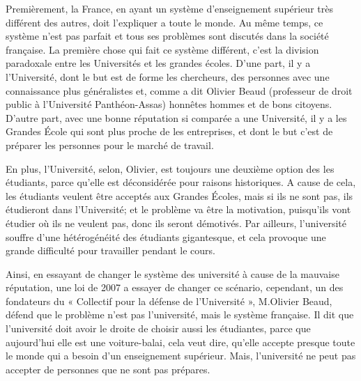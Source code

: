 \documentclass[a4paper,11pt]{article}
\begin{document}
\titleTMB 
\newpage


%




%



Premièrement, la France, en ayant un système d'enseignement supérieur très différent des autres, doit l'expliquer a toute le monde. Au même temps, ce système n'est pas parfait et tous ses problèmes sont discutés dans la société française.
La première chose qui fait ce système différent, c'est la division paradoxale entre les Universités et les grandes écoles.
D'une part, il y a l'Université, dont le but est de forme les chercheurs, des personnes avec une connaissance plus généralistes et, comme a dit Olivier Beaud (professeur de droit public à l’Université Panthéon-Assas)  honnêtes hommes et de bons citoyens.
D'autre part, avec une bonne réputation si comparée a une Université, il y a les
Grandes École qui sont  plus proche de les entreprises, et dont  le but c'est de
préparer les personnes pour le marché de travail.

En plus, l'Université, selon, Olivier, est toujours une deuxième option des les étudiants, parce qu'elle est déconsidérée pour raisons historiques. A cause de cela,  les étudiants veulent être acceptés aux Grandes Écoles, mais si ils ne sont  pas, ils étudieront dans l'Université; et le problème va être la motivation, puisqu'ils vont étudier où ils ne veulent pas, donc ils seront démotivés.
Par   ailleurs,   l'université  souffre   d'une   hétérogénéité  des   étudiants
gigantesque, et cela  provoque une grande difficulté pour  travailler pendant le
cours.

Ainsi, en essayant de changer le système des université à cause de la mauvaise réputation, une loi de 2007 a essayer de changer ce scénario, cependant, un des fondateurs du « Collectif pour la défense de l’Université », M.Olivier Beaud, défend que le problème n'est pas l'université, mais le système française. Il dit que l’université doit avoir le droite de choisir aussi les étudiantes, parce que aujourd'hui elle est une voiture-balai, cela veut dire, qu'elle accepte presque toute le monde qui a besoin d'un enseignement supérieur. Mais, l'université ne peut pas accepter de personnes que ne sont pas prépares.
\end{document}
